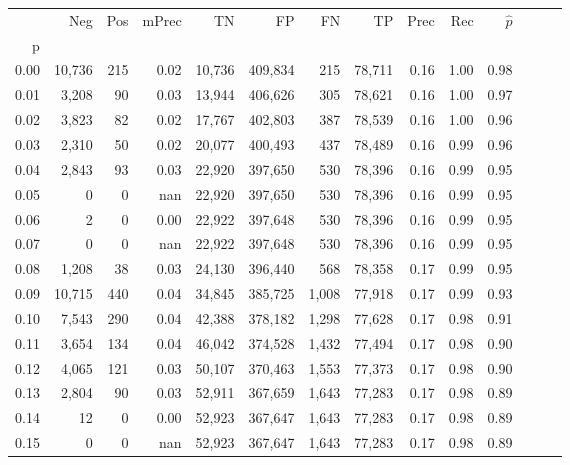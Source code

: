 \begin{tabular}{rrrrrrrrrrrrrr}
\toprule
{} &     Neg &    Pos & mPrec &       TN &       FP &      FN &      TP &  Prec &   Rec & $\hat{p}$ \\
p    &         &        &       &          &          &         &         &       &       &           \\
\midrule
0.00 &  10,736 &    215 &  0.02 &   10,736 &  409,834 &     215 &  78,711 &  0.16 &  1.00 &      0.98 \\
0.01 &   3,208 &     90 &  0.03 &   13,944 &  406,626 &     305 &  78,621 &  0.16 &  1.00 &      0.97 \\
0.02 &   3,823 &     82 &  0.02 &   17,767 &  402,803 &     387 &  78,539 &  0.16 &  1.00 &      0.96 \\
0.03 &   2,310 &     50 &  0.02 &   20,077 &  400,493 &     437 &  78,489 &  0.16 &  0.99 &      0.96 \\
0.04 &   2,843 &     93 &  0.03 &   22,920 &  397,650 &     530 &  78,396 &  0.16 &  0.99 &      0.95 \\
0.05 &       0 &      0 &   nan &   22,920 &  397,650 &     530 &  78,396 &  0.16 &  0.99 &      0.95 \\
0.06 &       2 &      0 &  0.00 &   22,922 &  397,648 &     530 &  78,396 &  0.16 &  0.99 &      0.95 \\
0.07 &       0 &      0 &   nan &   22,922 &  397,648 &     530 &  78,396 &  0.16 &  0.99 &      0.95 \\
0.08 &   1,208 &     38 &  0.03 &   24,130 &  396,440 &     568 &  78,358 &  0.17 &  0.99 &      0.95 \\
0.09 &  10,715 &    440 &  0.04 &   34,845 &  385,725 &   1,008 &  77,918 &  0.17 &  0.99 &      0.93 \\
0.10 &   7,543 &    290 &  0.04 &   42,388 &  378,182 &   1,298 &  77,628 &  0.17 &  0.98 &      0.91 \\
0.11 &   3,654 &    134 &  0.04 &   46,042 &  374,528 &   1,432 &  77,494 &  0.17 &  0.98 &      0.90 \\
0.12 &   4,065 &    121 &  0.03 &   50,107 &  370,463 &   1,553 &  77,373 &  0.17 &  0.98 &      0.90 \\
0.13 &   2,804 &     90 &  0.03 &   52,911 &  367,659 &   1,643 &  77,283 &  0.17 &  0.98 &      0.89 \\
0.14 &      12 &      0 &  0.00 &   52,923 &  367,647 &   1,643 &  77,283 &  0.17 &  0.98 &      0.89 \\
0.15 &       0 &      0 &   nan &   52,923 &  367,647 &   1,643 &  77,283 &  0.17 &  0.98 &      0.89 \\

\end{tabular}
